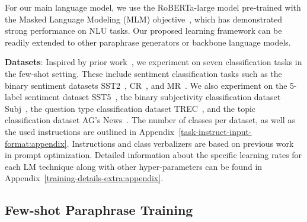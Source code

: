 \documentclass[11pt]{article}
\begin{document}
For our main language model, we use the RoBERTa-large model pre-trained with the Masked Language Modeling (MLM) objective~\cite{DBLP:journals/corr/abs-1907-11692}, which has demonstrated strong performance on NLU tasks. Our proposed learning framework can be readily extended to other paraphrase generators or backbone language models.



\noindent
\textbf{Datasets}: Inspired by prior work~\cite{gao-etal-2021-making, deng-etal-2022-rlprompt}, we experiment on seven classification tasks in the few-shot setting. These include sentiment classification tasks such as the binary sentiment datasets SST2~\cite{socher-etal-2013-recursive}, CR~\cite{10.1145/1014052.1014073}, and MR~\cite{pang-lee-2005-seeing}. We also experiment on the 5-label sentiment dataset SST5~\cite{socher-etal-2013-recursive}, the binary subjectivity classification dataset Subj~\cite{pang-lee-2004-sentimental}, the question type classification dataset TREC~\cite{10.1145/345508.345577}, and the topic classification dataset AG's News~\cite{DBLP:journals/corr/ZhangZL15}. The number of classes per dataset, as well as the used instructions are outlined in Appendix~\ref{task-instruct-input-format:appendix}. Instructions and class verbalizers are based on previous work~\cite{deng-etal-2022-rlprompt} in prompt optimization. Detailed information about the specific learning rates for each LM technique along with other hyper-parameters can be found in Appendix~\ref{training-details-extra:appendix}.

\subsection{Few-shot Paraphrase Training}
\label{final-RIFF-result}
\end{document}
